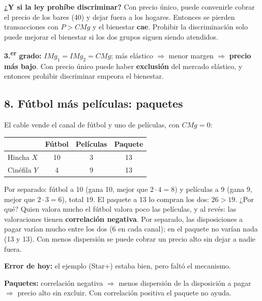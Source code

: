 \documentclass[11pt]{article}
\begin{document}
\textbf{¿Y si la ley prohíbe discriminar?} Con precio único, puede convenirle cobrar el precio de los bares (40) y dejar fuera a los hogares. Entonces se pierden transacciones con $P > CMg$ y el bienestar \textbf{cae}. Prohibir la discriminación solo puede mejorar el bienestar si los dos grupos siguen siendo atendidos.

\begin{clave}
\textbf{3.\textsuperscript{er} grado:} $IMg_1 = IMg_2 = CMg$; más elástico $\Rightarrow$ menor margen $\Rightarrow$ \textbf{precio más bajo}. Con precio único puede haber \textbf{exclusión} del mercado elástico, y entonces prohibir discriminar empeora el bienestar.
\end{clave}

\subsection*{8. Fútbol más películas: paquetes}

El cable vende el canal de fútbol y uno de películas, con $CMg = 0$:

\begin{center}
\begin{tabular}{lccc}
\toprule
 & Fútbol & Películas & Paquete \\
\midrule
Hincha $X$ & 10 & 3 & 13 \\
Cinéfila $Y$ & 4 & 9 & 13 \\
\bottomrule
\end{tabular}
\end{center}

Por separado: fútbol a 10 (gana 10, mejor que $2\cdot 4 = 8$) y películas a 9 (gana 9, mejor que $2\cdot 3 = 6$), total $19$. El paquete a 13 lo compran los dos: $26 > 19$. ¿Por qué? Quien valora mucho el fútbol valora poco las películas, y al revés: las valoraciones tienen \textbf{correlación negativa}. Por separado, las disposiciones a pagar varían mucho entre los dos (6 en cada canal); en el paquete no varían nada (13 y 13). Con menos dispersión se puede cobrar un precio alto sin dejar a nadie fuera.

\begin{error}
\textbf{Error de hoy:} el ejemplo (Star+) estaba bien, pero faltó el mecanismo.
\end{error}
\begin{clave}
\textbf{Paquetes:} correlación negativa $\Rightarrow$ menos dispersión de la disposición a pagar $\Rightarrow$ precio alto sin excluir. Con correlación positiva el paquete no ayuda.
\end{clave}
\end{document}
